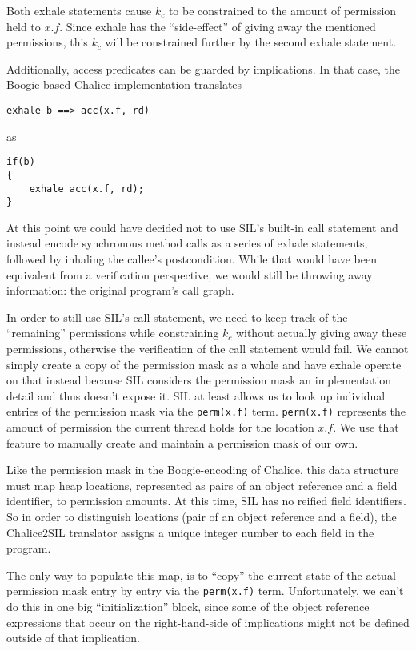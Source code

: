 Both exhale statements cause $k_c$ to be constrained to the amount of permission held to $x.f$. 
Since exhale has the “side-effect” of giving away the mentioned permissions, this $k_c$ will be constrained further by the second exhale statement.

Additionally, access predicates can be guarded by implications. 
In that case, the Boogie-based Chalice implementation translates 
\begin{lstlisting}[language=Chalice]
exhale b ==> acc(x.f, rd) 
\end{lstlisting}
as
\begin{lstlisting}[language=Chalice]
if(b) 
{ 
	exhale acc(x.f, rd);
}
\end{lstlisting}

At this point we could have decided not to use SIL's built-in call statement and instead encode synchronous method calls as a series of exhale statements, followed by inhaling the callee's postcondition. 
While that would have been equivalent from a verification perspective, we would still be throwing away information: the original program's call graph.

In order to still use SIL's call statement, we need to keep track of the “remaining” permissions while constraining $k_c$ without actually giving away these permissions, otherwise the verification of the call statement would fail. 
We cannot simply create a copy of the permission mask as a whole and have exhale operate on that instead because SIL considers the permission mask an implementation detail and thus doesn't expose it.
SIL at least allows us to look up individual entries of the permission mask via the \lstinline[language=SIL]!perm(x.f)! term. 
\lstinline[language=SIL]!perm(x.f)! represents the amount of permission the current thread holds for the location $x.f$.
We use that feature to manually create and maintain a permission mask of our own. 

Like the permission mask in the Boogie-encoding of Chalice, this data structure must map heap locations, represented as pairs of an object reference and a field identifier, to permission amounts. 
At this time, SIL has no reified field identifiers. 
So in order to distinguish locations (pair of an object reference and a field), the Chalice2SIL translator assigns a unique integer number to each field in the program. 

The only way to populate this map, is to ``copy'' the current state of the actual permission mask entry by entry via the \lstinline!perm(x.f)! term. 
Unfortunately, we can't do this in one big ``initialization'' block, since some of the object reference expressions that occur on the right-hand-side of implications might not be defined outside of that implication. 

